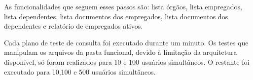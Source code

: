 As funcionalidades que seguem esses passos são: lista órgãos, lista empregados, lista dependentes, lista documentos dos empregados, lista documentos dos dependentes e relatório de empregados ativos.

Cada plano de teste de consulta foi executado durante um minuto. Os testes que manipulam os arquivos da pasta funcional, devido à limitação da arquitetura disponível, só foram realizados para 10 e 100 usuários simultâneos. O restante foi executado para 10,100 e 500 usuários simultâneos.